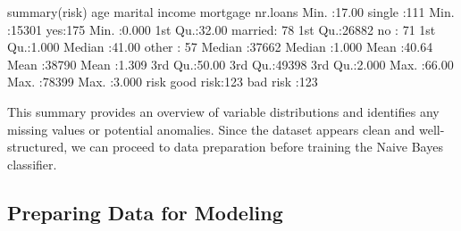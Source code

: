 \documentclass[
  11pt,
]{book}
\makeatletter
\newenvironment{Shaded}{}{}
\newcommand{\DecValTok}[1]{#1}
\newcommand{\FloatTok}[1]{#1}
\newcommand{\FunctionTok}[1]{#1}
\newcommand{\NormalTok}[1]{#1}
\newcommand{\SpecialCharTok}[1]{\textcolor[rgb]{0.39,0.39,0.39}{#1}}
\newenvironment{kframe}{%
\medskip{}
\setlength{\fboxsep}{.8em}
 \def\at@end@of@kframe{}%
 \ifinner\ifhmode%
  \def\at@end@of@kframe{\end{minipage}}%
  \begin{minipage}{\columnwidth}%
 \fi\fi%
 \def\FrameCommand##1{\hskip\@totalleftmargin \hskip-\fboxsep
 \colorbox{shadecolor}{##1}\hskip-\fboxsep
     \hskip-\linewidth \hskip-\@totalleftmargin \hskip\columnwidth}%
 \MakeFramed {\advance\hsize-\width
   \@totalleftmargin\z@ \linewidth\hsize
   \@setminipage}}%
 {\par\unskip\endMakeFramed%
 \at@end@of@kframe}
\renewenvironment{Shaded}{\begin{kframe}}{\end{kframe}}
\theoremstyle{definition}
\theoremstyle{definition}
\theoremstyle{definition}
\theoremstyle{definition}
\theoremstyle{remark}
\makeatother
\begin{document}
\begin{Shaded}
\begin{Highlighting}[]
\FunctionTok{summary}\NormalTok{(risk)}
\NormalTok{         age           marital        income      mortgage     nr.loans    }
\NormalTok{    Min.   }\SpecialCharTok{:}\FloatTok{17.00}\NormalTok{   single }\SpecialCharTok{:}\DecValTok{111}\NormalTok{   Min.   }\SpecialCharTok{:}\DecValTok{15301}\NormalTok{   yes}\SpecialCharTok{:}\DecValTok{175}\NormalTok{   Min.   }\SpecialCharTok{:}\FloatTok{0.000}  
    \DecValTok{1}\NormalTok{st Qu.}\SpecialCharTok{:}\FloatTok{32.00}\NormalTok{   married}\SpecialCharTok{:} \DecValTok{78}   \DecValTok{1}\NormalTok{st Qu.}\SpecialCharTok{:}\DecValTok{26882}\NormalTok{   no }\SpecialCharTok{:} \DecValTok{71}   \DecValTok{1}\NormalTok{st Qu.}\SpecialCharTok{:}\FloatTok{1.000}  
\NormalTok{    Median }\SpecialCharTok{:}\FloatTok{41.00}\NormalTok{   other  }\SpecialCharTok{:} \DecValTok{57}\NormalTok{   Median }\SpecialCharTok{:}\DecValTok{37662}\NormalTok{             Median }\SpecialCharTok{:}\FloatTok{1.000}  
\NormalTok{    Mean   }\SpecialCharTok{:}\FloatTok{40.64}\NormalTok{                 Mean   }\SpecialCharTok{:}\DecValTok{38790}\NormalTok{             Mean   }\SpecialCharTok{:}\FloatTok{1.309}  
    \DecValTok{3}\NormalTok{rd Qu.}\SpecialCharTok{:}\FloatTok{50.00}                 \DecValTok{3}\NormalTok{rd Qu.}\SpecialCharTok{:}\DecValTok{49398}             \DecValTok{3}\NormalTok{rd Qu.}\SpecialCharTok{:}\FloatTok{2.000}  
\NormalTok{    Max.   }\SpecialCharTok{:}\FloatTok{66.00}\NormalTok{                 Max.   }\SpecialCharTok{:}\DecValTok{78399}\NormalTok{             Max.   }\SpecialCharTok{:}\FloatTok{3.000}  
\NormalTok{           risk    }
\NormalTok{    good risk}\SpecialCharTok{:}\DecValTok{123}  
\NormalTok{    bad risk }\SpecialCharTok{:}\DecValTok{123}  
                   
                   
                   
   
\end{Highlighting}
\end{Shaded}

This summary provides an overview of variable distributions and identifies any missing values or potential anomalies. Since the dataset appears clean and well-structured, we can proceed to data preparation before training the Naive Bayes classifier.

\subsection*{Preparing Data for Modeling}\label{preparing-data-for-modeling-1}
\end{document}
